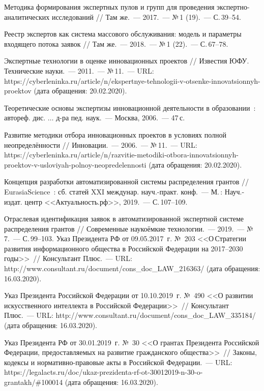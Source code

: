 \begin{thebibliography}{99}
\bibitem{} Методика формирования экспертных пулов и групп для проведения экспертно-аналитических исследований // Там же.~--- 2017.~--- №\,1 (19).~--- С.\,39--54.

\bibitem{} Реестр экспертов как система массового обслуживания: модель и параметры входящего потока заявок // Там же.~--- 2018.~--- №\,1 (22).~--- С.\,67--78.

\bibitem{} Экспертные технологии в оценке инновационных проектов // Известия ЮФУ. Технические науки.~--- 2011.~--- №\,11.~--- URL: https://cyberleninka.ru/article/n/ekspertnye-tehnologii-v-otsenke-innovatsionnyh-proektov (дата обращения: 20.02.2020).

\bibitem{} Теоретические основы экспертизы инновационной деятельности в образовании~: автореф. дис. $\dots$ д-ра пед. наук.~--- Москва, 2006.~--- 47\,с.


\bibitem{} Развитие методики отбора инновационных проектов в условиях полной неопределённости // Инновации.~--- 2006.~--- №\,11.~--- URL: https://cyberleninka.ru/article/n/razvitie-metodiki-otbora-innovatsionnyh-proektov-v-usloviyah-polnoy-neopredelennosti (дата обращения: 20.02.2020).

\bibitem{} Концепция разработки автоматизированной системы распределения грантов // EurasiaScience~: сб. статей XXI междунар. науч.-практ. конф.~--- М.\,: Науч.-издат. центр <<Актуальность.рф>>, 2019.~--- С.\,107--109.

\bibitem{} Отраслевая идентификация заявок в автоматизированной экспертной системе распределения грантов // Современные наукоёмкие технологии.~--- 2019.~--- №\,7.~--- С.\,99--103.
\enlargethispage{\baselineskip}
\bibitem{}Указ Президента РФ от 09.05.2017~г. №~203 <<О\,Стратегии развития информационного общества в Российской Федерации на 2017--2030 годы>>~// Консультант Плюс.~--- URL: http://www.consultant.ru/document/cons\_doc\_LAW\_216363/ (дата обращения: 16.03.2020).

\bibitem{}Указ Президента Российской Федерации от 10.10.2019~г. №~490 <<О развитии искусственного интеллекта в Российской Федерации>>~// Консультант Плюс.~--- URL: http://www.consultant.ru/document/cons\_doc\_LAW\_335184/ (дата обращения: 16.03.2020).

\bibitem{}Указ Президента РФ от 30.01.2019~г. №~30 <<О грантах Президента Российской Федерации, предоставляемых на развитие гражданского общества>>~// Законы, кодексы и нормативно-правовые акты в Российской Федерации.~--- URL: https://legalacts.ru/doc/ukaz-prezidenta-rf-ot-30012019-n-30-o-grantakh/\#100014 (дата обращения: 16.03.2020).



\end{thebibliography}
